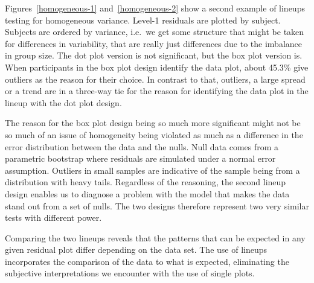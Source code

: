 \documentclass[12pt]{article} %
\newcommand{\hh}[1]{{\color{orange} #1}}
\begin{document}
Figures~\ref{homogeneous-1} and~\ref{homogeneous-2} show a second example of lineups testing for homogeneous variance.
Level-1 residuals are plotted by subject. Subjects are ordered by variance, i.e.~we get some structure that might be taken for differences in variability, that are really just differences due to the imbalance in group size. The dot plot version is not significant, but the box plot version is. When participants in the box plot design identify the data plot, about 45.3\% give outliers as the reason for their choice. In contrast to that, outliers, a large spread or a trend are in a three-way tie for the reason for identifying the data plot in the lineup with the dot plot design.

The reason for the box plot design being so much more significant might not be so much of an issue of homogeneity being violated as much as a difference in the error distribution between the data and the nulls. Null data comes from a parametric bootstrap where residuals are simulated under a normal error assumption. Outliers in small samples are indicative of the sample being from a distribution with heavy tails.
Regardless of the reasoning, the second lineup design enables us to diagnose a problem with the model that makes the data stand out from a set of nulls.  The two designs therefore represent two very similar tests with different power.




Comparing the two lineups reveals that the patterns that can be expected in any given residual plot differ depending on the data set. The use of lineups incorporates the comparison of the data to what is expected, eliminating the subjective interpretations we encounter with the use of single plots. 



\end{document}
